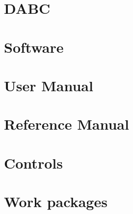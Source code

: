 \documentclass{dabcclass}
\begin{document}
\chapter{DABC}
 \cleardoublepage
\chapter{Software}
 \cleardoublepage
\chapter{User Manual}
 \cleardoublepage
\chapter{Reference Manual}
 \cleardoublepage
\chapter{Controls}
 \cleardoublepage
\chapter{Work packages}
 \cleardoublepage

\thispagestyle{empty}
 \cleardoublepage

\end{document}
